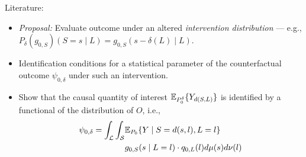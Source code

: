\documentclass{beamer}
\begin{document}
\begin{frame}[c]{Literature: \cite{diaz2012population, diaz2018stochastic}}

\begin{center}
\begin{itemize}
  \itemsep8pt
  \item \textit{Proposal:} Evaluate outcome under an altered
    \textit{intervention distribution} --- e.g.,
    $P_{\delta}(g_{0,S})(S = s \mid L) = g_{0,S}(s - \delta(L) \mid L)$.
  \item Identification conditions for a statistical parameter of the
    counterfactual outcome $\psi_{0,\delta}$ under such an intervention.
  \item Show that the causal quantity of interest $\mathbb{E}_{P_0^{\delta}}
    \{Y_{d(S, L)}\}$ is identified by a functional of the distribution of $O$,
    i.e.,
    \begin{align*}
      \psi_{0,\delta} = \int_{\mathcal{L}} \int_{\mathcal{S}} &\mathbb{E}_{P_0}
        \{Y \mid S = d(s, l), L = l\} \\ &g_{0, S}(s \mid L = l) \cdot
        q_{0, L}(l) d\mu(s)d\nu(l)
    \end{align*}
\end{itemize}
\end{center}


\end{frame}

\end{document}
